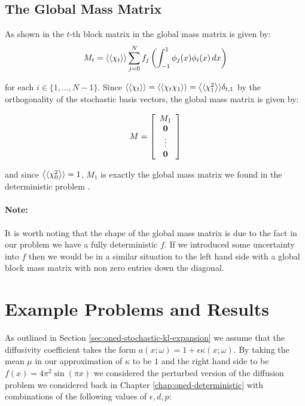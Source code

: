 \subsection{The Global Mass Matrix}

As shown in  the $t$-th block matrix in the
global mass matrix is given by:
\begin{equation}
    M_t = \left\langle\langle\chi_t\right\rangle\rangle\sum_{j=0}^Nf_j\left(
        \int_{-1}^1\phi_j(x)\phi_i(x)\, dx\right)
\end{equation}

for each $i \in \{1,\ldots,N-1\}$. Since $\left\langle\langle\chi_t\right\rangle\rangle =
\left\langle\langle\chi_t\chi_1\right\rangle\rangle = \left\langle\langle\chi_1^2\right\rangle\rangle\delta_{t, 1}$ by the orthogonality of
the stochastic basis vectors, the global mass matrix is given by:

\begin{equation}
    M = \left[\begin{array}{c}
        M_1 \\ \mathbf{0} \\ \vdots \\ \mathbf{0}
    \end{array}\right]
\end{equation}

and since $\left\langle\langle\chi_0^2\right\rangle\rangle = 1$, $M_1$ is exactly the global mass matrix we
found in the deterministic problem .

\paragraph{Note:}

It is worth noting that the shape of the global mass matrix is due to the fact
in our problem we have a fully deterministic $f$. If we introduced some
uncertainty into $f$ then we would be in a similar situation to the left hand
side with a global block mass matrix with non zero entries down the diagonal.

\section{Example Problems and Results}

As outlined in Section \ref{sec:oned-stochastic-kl-expansion} we assume that
the diffusivity coefficient takes the form $a(x;\omega) = 1 +
\epsilon\kappa(x;\omega)$. By taking the mean $\mu$ in our approximation of
$\kappa$ to be $1$ and the right hand side to be $f(x) = 4\pi^2\sin{(\pi x)}$
we considered the perturbed version of the diffusion problem we considered back
in Chapter \ref{chap:oned-deterministic} with combinations of the following
values of $\epsilon, d, p$:

